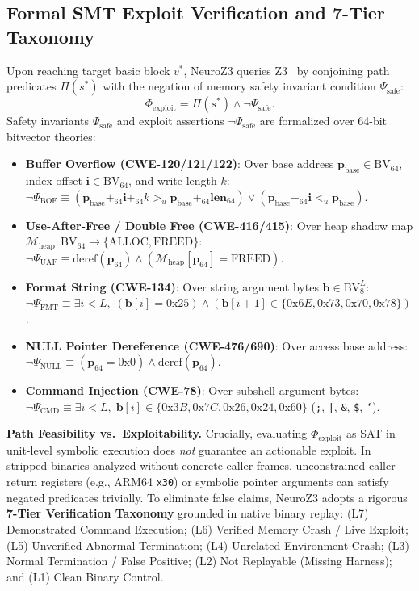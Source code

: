 \documentclass[10pt,conference]{IEEEtran}
\begin{document}
\subsection{Formal SMT Exploit Verification and 7-Tier Taxonomy}
Upon reaching target basic block $v^*$, NeuroZ3 queries Z3~\cite{demoura2008z3} by conjoining path predicates $\Pi(s^*)$ with
the negation of memory safety invariant condition $\Psi_{\text{safe}}$:
\begin{equation}
  \Phi_{\text{exploit}} = \Pi(s^*) \land \neg \Psi_{\text{safe}}.
  \label{eq:smt_condition}
\end{equation}
Safety invariants $\Psi_{\text{safe}}$ and exploit assertions $\neg \Psi_{\text{safe}}$ are formalized over 64-bit bitvector theories:
\begin{itemize}
  \item \textbf{Buffer Overflow (CWE-120/121/122)}: Over base address $\mathbf{p}_{\text{base}} \in \text{BV}_{64}$, index offset $\mathbf{i} \in \text{BV}_{64}$, and write length $k$:
  $\neg \Psi_{\text{BOF}} \equiv (\mathbf{p}_{\text{base}} +_{64} \mathbf{i} +_{64} k >_{u} \mathbf{p}_{\text{base}} +_{64} \mathbf{len}_{64}) \lor (\mathbf{p}_{\text{base}} +_{64} \mathbf{i} <_{u} \mathbf{p}_{\text{base}})$.
  \item \textbf{Use-After-Free / Double Free (CWE-416/415)}: Over heap shadow map $\mathcal{M}_{\text{heap}}: \text{BV}_{64} \to \{\text{ALLOC}, \text{FREED}\}$:
  $\neg \Psi_{\text{UAF}} \equiv \text{deref}(\mathbf{p}_{64}) \land (\mathcal{M}_{\text{heap}}[\mathbf{p}_{64}] = \text{FREED})$.
  \item \textbf{Format String (CWE-134)}: Over string argument bytes $\mathbf{b} \in \text{BV}_8^{L}$:
  $\neg \Psi_{\text{FMT}} \equiv \exists i < L, \; (\mathbf{b}[i] = 0\text{x}25) \land (\mathbf{b}[i+1] \in \{0\text{x}6E, 0\text{x}73, 0\text{x}70, 0\text{x}78\})$.
  \item \textbf{NULL Pointer Dereference (CWE-476/690)}: Over access base address:
  $\neg \Psi_{\text{NULL}} \equiv (\mathbf{p}_{64} = 0\text{x}0) \land \text{deref}(\mathbf{p}_{64})$.
  \item \textbf{Command Injection (CWE-78)}: Over subshell argument bytes:
  $\neg \Psi_{\text{CMD}} \equiv \exists i < L, \; \mathbf{b}[i] \in \{0\text{x}3B, 0\text{x}7C, 0\text{x}26, 0\text{x}24, 0\text{x}60\}$ (\texttt{;}, \texttt{|}, \texttt{\&}, \texttt{\$}, \texttt{`}).
\end{itemize}

\textbf{Path Feasibility vs.\ Exploitability.} Crucially, evaluating $\Phi_{\text{exploit}}$ as SAT in unit-level symbolic execution
does \emph{not} guarantee an actionable exploit. In stripped binaries analyzed without concrete caller frames, unconstrained caller
return registers (e.g., ARM64 \texttt{x30}) or symbolic pointer arguments can satisfy negated predicates trivially. To eliminate
false claims, NeuroZ3 adopts a rigorous \textbf{7-Tier Verification Taxonomy} grounded in native binary replay:
(L7) Demonstrated Command Execution; (L6) Verified Memory Crash / Live Exploit; (L5) Unverified Abnormal Termination;
(L4) Unrelated Environment Crash; (L3) Normal Termination / False Positive; (L2) Not Replayable (Missing Harness); and
(L1) Clean Binary Control.
\end{document}

